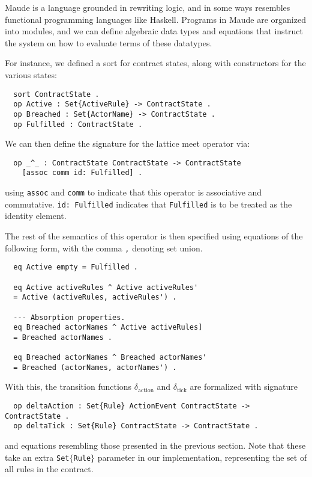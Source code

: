 \documentclass{article}
\begin{document}
Maude is a language grounded in rewriting logic, and in some ways resembles
functional programming languages like Haskell.
Programs in Maude are organized into modules, and we can define algebraic data
types and equations that instruct the system on how to evaluate terms of these
datatypes.

For instance, we defined a sort for contract states, along with constructors
for the various states:
\begin{lstlisting}
  sort ContractState .
  op Active : Set{ActiveRule} -> ContractState .
  op Breached : Set{ActorName} -> ContractState .
  op Fulfilled : ContractState .
\end{lstlisting}

We can then define the signature for the lattice meet operator via:

\begin{lstlisting}
  op _^_ : ContractState ContractState -> ContractState
    [assoc comm id: Fulfilled] .
\end{lstlisting}

using \texttt{assoc} and \texttt{comm} to indicate that this operator is
associative and commutative.
\texttt{id: Fulfilled} indicates that \texttt{Fulfilled}
is to be treated as the identity element.

The rest of the semantics of this operator is then specified using equations of
the following form, with the comma \texttt{,} denoting set union.
\begin{lstlisting}
  eq Active empty = Fulfilled .

  eq Active activeRules ^ Active activeRules'
  = Active (activeRules, activeRules') .

  --- Absorption properties.
  eq Breached actorNames ^ Active activeRules]
  = Breached actorNames .

  eq Breached actorNames ^ Breached actorNames'
  = Breached (actorNames, actorNames') .
\end{lstlisting}

With this, the transition functions $\delta_\text{action}$ and
$\delta_\text{tick}$ are formalized with signature

\begin{lstlisting}
  op deltaAction : Set{Rule} ActionEvent ContractState -> ContractState .
  op deltaTick : Set{Rule} ContractState -> ContractState .
\end{lstlisting}

and equations resembling those presented in the previous section.
Note that these take an extra \texttt{Set$\{$Rule$\}$} parameter in our implementation,
representing the set of all rules in the contract.
\end{document}
